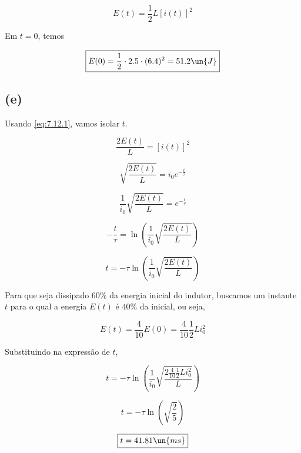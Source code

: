 \begin{equation}\label{eq:7.12.1}
    E(t) = \frac{1}{2}L[i(t)]^2
\end{equation}

Em $t =0$, temos   

\[ \boxed{E(0) = \frac{1}{2} \cdot 2.5 \cdot (6.4)^2 = 51.2 \un{J}}   \]

\subsection*{(e)}

Usando \eqref{eq:7.12.1}, vamos isolar $t$.

\[ \frac{2E(t)}{L} = [i(t)]^2 \]

\[ \sqrt{\frac{2E(t)}{L}} = i_0e^{-\frac{t}{\tau}} \]

\[ \frac{1}{i_0} \sqrt{\frac{2E(t)}{L}} = e^{-\frac{t}{\tau}} \]

\[ -\frac{t}{\tau} = \ln\left(\frac{1}{i_0} \sqrt{\frac{2E(t)}{L}}\right) \]

\[ t = - \tau \ln\left(\frac{1}{i_0} \sqrt{\frac{2E(t)}{L}}\right) \]

Para que seja dissipado $60\%$ da energia inicial do indutor, buscamos um instante $t$ para o qual a energia $E(t)$ é
$40\%$ da inicial, ou seja, 

\[ E(t) = \frac{4}{10}E(0) = \frac{4}{10}\frac{1}{2}Li_0^2  \]

Substituindo na expressão de $t$,

\[ t = - \tau \ln\left(\frac{1}{i_0} \sqrt{\frac{2\frac{4}{10}\frac{1}{2}Li_0^2}{L}}\right) \]

\[ t = - \tau \ln\left(\sqrt{\frac{2}{5}}\right) \]

\[ \boxed{t = 41.81 \un{ms}}   \]








